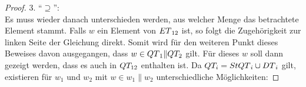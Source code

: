 \begin{proof}
  3. ``$\supseteq$'':\\
  Es muss wieder danach unterschieden werden, aus welcher Menge das betrachtete
  Element stammt. Falls $w$ ein Element von $ET{}_{12}$ ist, so folgt die
  Zugehörigkeit zur linken Seite der Gleichung direkt. Somit wird für den
  weiteren Punkt dieses Beweises davon ausgegangen, dass $w\in QT{}_1\|QT_2$
  gilt. Für dieses $w$ soll dann gezeigt werden, dass es auch in $QT_{12}$
  enthalten ist. Da $QT_i=StQT{}_i\cup DT{}_i$ gilt, existieren für $w_1$ und
  $w_2$ mit $w\in w_1\|w_2$ unterschiedliche Möglichkeiten:
\end{proof}
